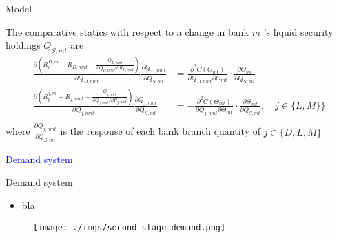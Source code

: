 \documentclass[notes,11pt, aspectratio=169]{beamer}
\begin{document}
\begin{frame}{Model}


    The comparative statics with respect to a change in bank $m$ 's liquid security holdings $Q_{S, m t}$ are
$$
\begin{aligned}
\frac{\partial\left(R_t^{D, m}-R_{D, n m t}-\frac{Q_{D, n m t}}{\partial Q_{D, n m t} / \partial R_{D, n m t}}\right)}{\partial Q_{D, n m t}} \frac{\partial Q_{D, n m t}}{\partial Q_{S, m t}} & =\frac{\partial^2 C\left(\Theta_{m t}\right)}{\partial Q_{D, n m t} \partial \Theta_{m t}} \cdot \frac{\partial \Theta_{m t}}{\partial Q_{S, m t}} \\
\frac{\partial\left(R_t^{j, m}-R_{j, n m t}-\frac{Q_{j, n m t}}{\partial Q_{j, n m t} / \partial R_{j, n m t}}\right)}{\partial Q_{j, n m t}} \frac{\partial Q_{j, n m t}}{\partial Q_{S, m t}} & =-\frac{\partial^2 C\left(\Theta_{m t}\right)}{\partial Q_{j, n m t} \partial \Theta_{m t}} \cdot \frac{\partial \Theta_{m t}}{\partial Q_{S, m t}}, \quad j \in \{ L,M\} \}  \\
\end{aligned}
$$
 where $\frac{\partial Q_{j, n m t}}{\partial Q_{S, m t}}$ is the response of each bank branch quantity of $j \in \{D,L,M \}$ %
\end{frame}


\begin{frame}
    \textcolor{blue}{\huge{\centerline{Demand system}}}
\end{frame}


  
\begin{frame}{Demand system}
    \vspace{0.5cm}
      \begin{itemize}
        \item  bla
      \end{itemize}
      
        \begin{figure}[t*]
          \centering
    
          \texttt{[image: ./imgs/second\_stage\_demand.png]}
        \end{figure}
        
      \end{frame}
\end{document}
